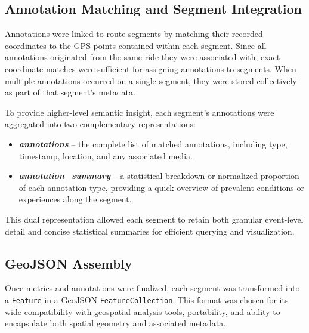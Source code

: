 \subsection{Annotation Matching and Segment Integration}

Annotations were linked to route segments by matching their recorded coordinates to the GPS points contained within each segment. Since all annotations originated from the same ride they were associated with, exact coordinate matches were sufficient for assigning annotations to segments. When multiple annotations occurred on a single segment, they were stored collectively as part of that segment’s metadata.

To provide higher-level semantic insight, each segment’s annotations were aggregated into two complementary representations:

\begin{itemize}
    \item \textbf{\textit{annotations}} – the complete list of matched annotations, including type, timestamp, location, and any associated media.
    \item \textbf{\textit{annotation\_summary}} – a statistical breakdown or normalized proportion of each annotation type, providing a quick overview of prevalent conditions or experiences along the segment.
\end{itemize}

This dual representation allowed each segment to retain both granular event-level detail and concise statistical summaries for efficient querying and visualization.

\subsection{GeoJSON Assembly}

Once metrics and annotations were finalized, each segment was transformed into a \texttt{Feature} in a GeoJSON \texttt{FeatureCollection}. This format was chosen for its wide compatibility with geospatial analysis tools, portability, and ability to encapsulate both spatial geometry and associated metadata.

